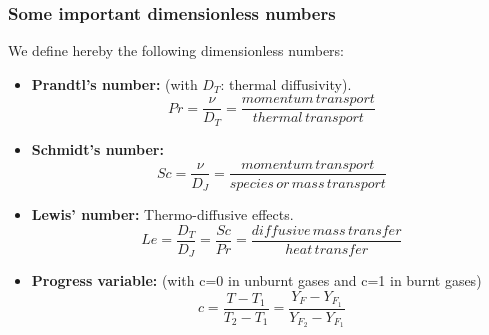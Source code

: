 \documentclass[a4paper,11pt]{article}
\begin{document}
\subsubsection{Some important dimensionless numbers}
We define hereby the following dimensionless numbers:
\begin{itemize}
	\item \textbf{Prandtl's number:} (with $D_T$: thermal diffusivity).
	\[Pr = \frac{\nu}{D_T}=\frac{momentum \, transport}{thermal \, transport}\]
	\item \textbf{Schmidt's number:} 
	\[Sc=\frac{\nu}{D_J}=\frac{momentum \, transport}{species \, or \, mass \, transport}\]
	\item \textbf{Lewis' number:} Thermo-diffusive effects.
	\[Le=\frac{D_T}{D_J} = \frac{Sc}{Pr} = \frac{diffusive \, mass \, transfer}{heat \, transfer}\]
	\item \textbf{Progress variable:} (with c=0 in unburnt gases and c=1 in burnt gases)
	\[c = \frac{T-T_1}{T_2 - T_1} = \frac{Y_F - Y_{F_1}}{Y_{F_2}-Y_{F_1}}\]
\end{itemize}
\pagebreak
\end{document}
